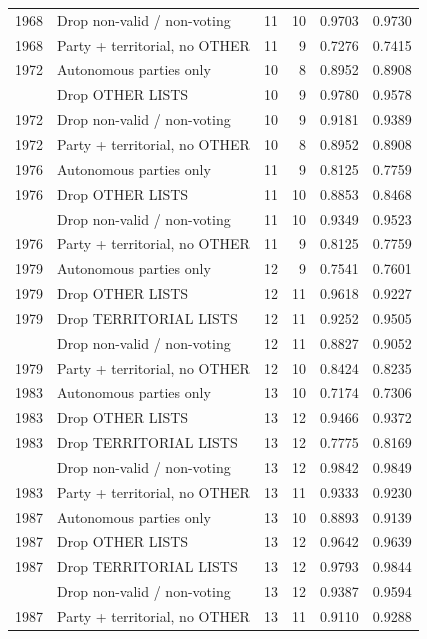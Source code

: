 \begin{longtable}[t]{rlrrrr}
1968 & Drop non-valid / non-voting & 11 & 10 & 0.9703 & 0.9730\\
1968 & Party + territorial, no OTHER & 11 & 9 & 0.7276 & 0.7415\\
1972 & Autonomous parties only & 10 & 8 & 0.8952 & 0.8908\\
\addlinespace
1972 & Drop OTHER LISTS & 10 & 9 & 0.9780 & 0.9578\\
1972 & Drop non-valid / non-voting & 10 & 9 & 0.9181 & 0.9389\\
1972 & Party + territorial, no OTHER & 10 & 8 & 0.8952 & 0.8908\\
1976 & Autonomous parties only & 11 & 9 & 0.8125 & 0.7759\\
1976 & Drop OTHER LISTS & 11 & 10 & 0.8853 & 0.8468\\
\addlinespace
1976 & Drop non-valid / non-voting & 11 & 10 & 0.9349 & 0.9523\\
1976 & Party + territorial, no OTHER & 11 & 9 & 0.8125 & 0.7759\\
1979 & Autonomous parties only & 12 & 9 & 0.7541 & 0.7601\\
1979 & Drop OTHER LISTS & 12 & 11 & 0.9618 & 0.9227\\
1979 & Drop TERRITORIAL LISTS & 12 & 11 & 0.9252 & 0.9505\\
\addlinespace
1979 & Drop non-valid / non-voting & 12 & 11 & 0.8827 & 0.9052\\
1979 & Party + territorial, no OTHER & 12 & 10 & 0.8424 & 0.8235\\
1983 & Autonomous parties only & 13 & 10 & 0.7174 & 0.7306\\
1983 & Drop OTHER LISTS & 13 & 12 & 0.9466 & 0.9372\\
1983 & Drop TERRITORIAL LISTS & 13 & 12 & 0.7775 & 0.8169\\
\addlinespace
1983 & Drop non-valid / non-voting & 13 & 12 & 0.9842 & 0.9849\\
1983 & Party + territorial, no OTHER & 13 & 11 & 0.9333 & 0.9230\\
1987 & Autonomous parties only & 13 & 10 & 0.8893 & 0.9139\\
1987 & Drop OTHER LISTS & 13 & 12 & 0.9642 & 0.9639\\
1987 & Drop TERRITORIAL LISTS & 13 & 12 & 0.9793 & 0.9844\\
\addlinespace
1987 & Drop non-valid / non-voting & 13 & 12 & 0.9387 & 0.9594\\
1987 & Party + territorial, no OTHER & 13 & 11 & 0.9110 & 0.9288\\

\end{longtable}
